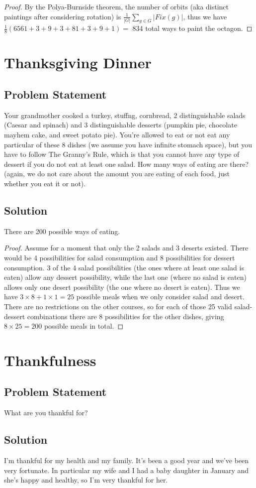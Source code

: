 \documentclass[12pt]{article}
\newcommand{\ProblemStatement}[1]{
\subsection*{Problem Statement}
#1
\subsection*{Solution}
}
\begin{document}
\begin{proof}
By the Polya-Burnside theorem, the number of orbits (aka distinct paintings
after considering rotation) is $\frac{1}{|G|}\sum_{g \in G} |Fix(g)|$, thus we
have $\frac{1}{8}(6561 + 3 + 9 + 3 + 81 + 3 + 9 + 1) = $ 834 total ways to
paint the octagon.
\end{proof}


\section{Thanksgiving Dinner}
\ProblemStatement{
Your grandmother cooked a turkey, stuffng, cornbread, 2 distinguishable salads
(Caesar and spinach) and 3 distinguishable desserts (pumpkin pie, chocolate
mayhem cake, and sweet potato pie). You're allowed to eat or not eat any
particular of these 8 dishes (we assume you have infinite stomach space), but
you have to follow The Granny's Rule, which is that you cannot have any type of
dessert if you do not eat at least one salad. How many ways of eating are there?
(again, we do not care about the amount you are eating of each food, just
whether you eat it or not).  
}

There are 200 possible ways of eating.

\begin{proof}
Assume for a moment that only the 2 salads and 3 deserts existed. There would be 4
possibilities for salad consumption and 8 possibilities for dessert consumption.
3 of the 4 salad possibilities (the ones where at least one salad is eaten)
allow any dessert possibility, while the last one (where no salad is eaten)
allows only one desert possibility (the one where no desert is eaten). Thus we
have $3 \times 8 + 1 \times 1 = 25$ possible meals when we only consider salad
and desert. There are no restrictions on the other courses, so for each of those
25 valid salad-dessert combinations there are 8 possibilities for the
other dishes, giving $8 \times 25 = 200$ possible meals in total.
\end{proof}


\section{Thankfulness}
\ProblemStatement{
What are you thankful for?
}

I'm thankful for my health and my family. It's been a good year and we've been
very fortunate. In particular my wife and I had a baby daughter in January and
she's happy and healthy, so I'm very thankful for her.
\end{document}
